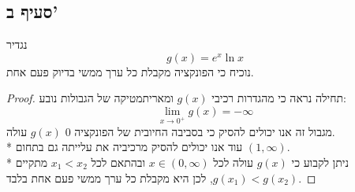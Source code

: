 \subsection{סעיף ב'}
נגדיר
\[
	g(x) = e^x \ln x
\]
נוכיח כי הפונקציה מקבלת כל ערך ממשי בדיוק פעם אחת.
\begin{proof}
	תחילה נראה כי מהגדרות רכיבי $g(x)$ ומאריתמטיקה של הגבולות נובע:
	\[
		\lim_{x \to 0^+} g(x) = -\infty
	\]
	מגבול זה אנו יכולים להסיק כי בסביבה החיובית של הפונקציה $0$ $g(x)$ עולה. \\*
	עוד אנו יכולים להסיק מרכיביה את עלייתה גם בתחום $(1, \infty)$. \\*
	ניתן לקבוע כי $g(x)$ עולה לכל $x \in (0, \infty)$ ובהתאם לכל $x_1 < x_2$ מתקיים $g(x_1) < g(x_2)$,
	לכן היא מקבלת כל ערך ממשי פעם אחת בלבד.
\end{proof}

